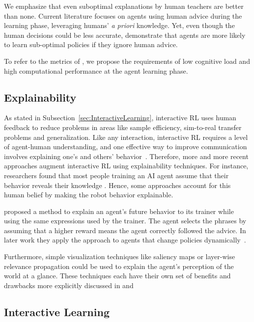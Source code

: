 \documentclass[twoside,11pt]{article}
\begin{document}
We emphasize that even suboptimal explanations by human teachers are better than none. Current literature focuses on agents using human advice during the learning phase, leveraging humans' \emph{a priori} knowledge. Yet, even though the human decisions could be less accurate, \citet{Zhang:2020:human_out_loop} demonstrate that agents are more likely to learn sub-optimal policies if they ignore human advice. 

To refer to the metrics of \citet{milani2022survey}, we propose the requirements of low cognitive load and high computational performance at the agent learning phase.

\subsection{Explainability}
As stated in Subsection~\ref{sec:InteractiveLearning}, interactive RL uses human feedback to reduce problems in areas like sample efficiency, sim-to-real transfer problems and generalization. Like any interaction, interactive RL requires a level of agent-human understanding, and one effective way to improve communication involves explaining one's and others' behavior~\citep{de:17}. Therefore, more and more recent approaches augment interactive RL using explainability techniques. For instance, researchers found that most people training an AI agent assume that their behavior reveals their knowledge \citep{habibian:21}. Hence, some approaches account for this human belief by making the robot behavior explainable.

\citet{fukuchi2017autonomous} proposed a method to explain an agent's future behavior to its trainer while using the same expressions used by the trainer. The agent selects the phrases by assuming that a higher reward means the agent correctly followed the advice. In later work they apply the approach to agents that change policies dynamically~\citep{fukuchi2017application}. 

Furthermore, simple visualization techniques like saliency maps or layer-wise relevance propagation could be used to explain the agent's perception of the world at a glance. These techniques each have their own set of benefits and drawbacks more explicitly discussed in \citet{LiuEtAl:2018:LinearModelUTrees} and \citet{Bach:2015:LayerWiseRelevancePropagation}


\subsection{Interactive Learning}
\end{document}
